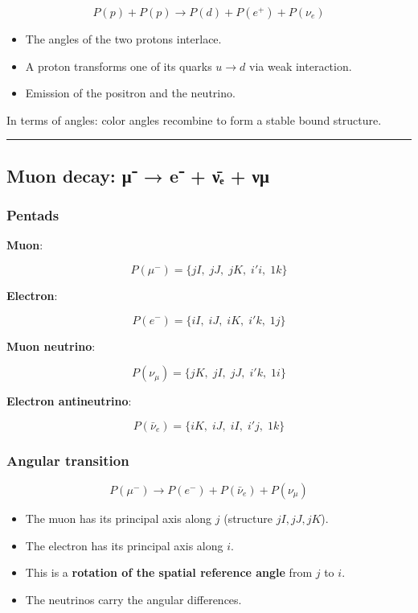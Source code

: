 \documentclass[11pt]{article}
\providecommand{\tightlist}{%
\setlength{\itemsep}{2pt}\setlength{\parskip}{6pt}
}
\begin{document}
\[P(p) + P(p) \to P(d) + P(e^+) + P(\nu_e)\]

\begin{itemize}
\tightlist
\item
  The angles of the two protons interlace.
\item
  A proton transforms one of its quarks \(u \to d\) via weak
  interaction.
\item
  Emission of the positron and the neutrino.
\end{itemize}

In terms of angles: color angles recombine to form a stable bound
structure.

\begin{center}\rule{0.5\linewidth}{0.5pt}\end{center}

\hypertarget{muon-decay-ux3bc-e-ux3bdux2091-ux3bdux3bc}{%
\subsection{Muon decay: μ⁻ → e⁻ + ν̄ₑ +
νμ}\label{muon-decay-ux3bc-e-ux3bdux2091-ux3bdux3bc}}

\hypertarget{pentads-1}{%
\subsubsection{Pentads}\label{pentads-1}}

\textbf{Muon}:

\[P(\mu^-) = \{ jI,\; jJ,\; jK,\; i'i,\; 1k \}\]

\textbf{Electron}:

\[P(e^-) = \{ iI,\; iJ,\; iK,\; i'k,\; 1j \}\]

\textbf{Muon neutrino}:

\[P(\nu_\mu) = \{ jK,\; jI,\; jJ,\; i'k,\; 1i \}\]

\textbf{Electron antineutrino}:

\[P(\bar{\nu}_e) = \{ iK,\; iJ,\; iI,\; i'j,\; 1k \}\]

\hypertarget{angular-transition-3}{%
\subsubsection{Angular transition}\label{angular-transition-3}}

\[P(\mu^-) \to P(e^-) + P(\bar{\nu}_e) + P(\nu_\mu)\]

\begin{itemize}
\tightlist
\item
  The muon has its principal axis along \(j\) (structure
  \(jI, jJ, jK\)).
\item
  The electron has its principal axis along \(i\).
\item
  This is a \textbf{rotation of the spatial reference angle} from \(j\)
  to \(i\).
\item
  The neutrinos carry the angular differences.
\end{itemize}
\end{document}
